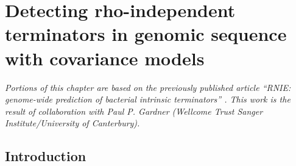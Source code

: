 
\chapter{Detecting rho-independent terminators in genomic sequence with covariance models}
\label{sec:chapterPingpong}
\ifpdf
    \graphicspath{{Chapter4/Chapter4Figs/EPS/}{Chapter4/Chapter4Figs/}}
\fi

\textit{Portions of this chapter are based on the previously published article ``RNIE: genome-wide prediction of bacterial intrinsic terminators'' \parencite{Gardner2011a}. This work is the result of collaboration with Paul P. Gardner (Wellcome Trust Sanger Institute/University of Canterbury). }

\section{Introduction}
